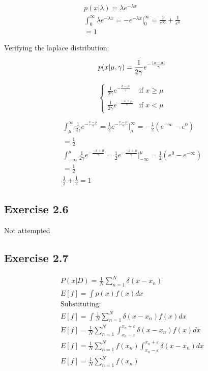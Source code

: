 \begin{gather}
  p(x|\lambda) = \lambda e^{-\lambda x} \\
  \int_{0}^{\infty} \lambda e^{-\lambda x} = -e^{-\lambda x} \Big |_0^\infty = \frac{1}{e^\infty} + \frac{1}{e^0} \\
 = 1
\end{gather}

Verifying the laplace distribution:

\begin{equation}
  p(x|\mu,\gamma) = \frac{1}{2\gamma} e^{-\frac{|x-\mu|}{\gamma}} \\
\end{equation}


\begin{equation}
  \begin{cases}
    \frac{1}{2\gamma} e^{-\frac{x-\mu}{\gamma}} & \text{if } x \geq \mu \\
    \frac{1}{2\gamma} e^{-\frac{-x+\mu}{\gamma}} & \text{if } x < \mu
  \end{cases}
\end{equation}

\begin{gather}
  \int_{\mu}^{\infty}\frac{1}{2\gamma} e^{-\frac{x-\mu}{\gamma}} = \frac{1}{2} e^{-\frac{x-\mu}{\gamma}} \Big |_\mu^\infty = -\frac{1}{2}(e^{-\infty} - e^0) \\
  = \frac{1}{2} \\
  \int_{-\infty}^{\mu}\frac{1}{2\gamma} e^{-\frac{-x+\mu}{\gamma}} = \frac{1}{2} e^{-\frac{-x+\mu}{\gamma}} \Big |_{-\infty}^\mu = \frac{1}{2}(e^{0} - e^{-\infty}) \\
  = \frac{1}{2} \\ 
  \frac{1}{2} + \frac{1}{2} = 1
\end{gather}


\subsection{Exercise 2.6}
Not attempted

\subsection{Exercise 2.7}

\begin{gather}
  P(x|D) = \frac{1}{N}\sum_{n=1}^N \delta(x-x_n) \\
  E[f] = \int p(x)f(x)dx \\
  \text{Substituting:} \\
  E[f] = \int \frac{1}{N}\sum_{n=1}^N \delta(x-x_n) f(x) dx \\
  E[f] =  \frac{1}{N}\sum_{n=1}^N \int_{x_n- \varepsilon}^{x_n + \varepsilon} \delta(x-x_n) f(x) dx \\
  E[f] =  \frac{1}{N}\sum_{n=1}^N f(x_n) \int_{x_n- \varepsilon}^{x_n + \varepsilon} \delta(x-x_n) dx \\
  E[f] =  \frac{1}{N}\sum_{n=1}^N f(x_n)
\end{gather}

